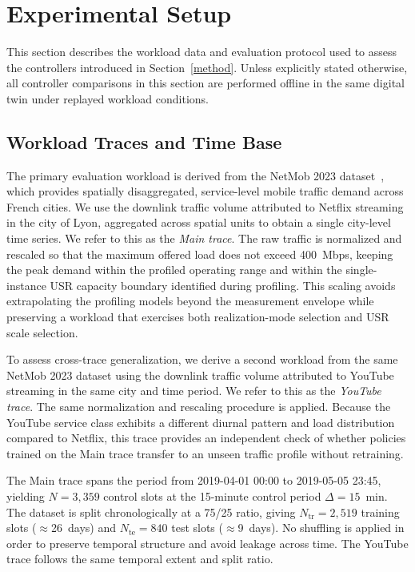 \documentclass[a4paper,fleqn]{cas-sc}
\begin{document}
\section{Experimental Setup}
\label{testbed}

This section describes the workload data and evaluation protocol used to assess the controllers introduced in Section~\ref{method}. Unless explicitly stated otherwise, all controller comparisons in this section are performed offline in the same digital twin under replayed workload conditions.

\subsection{Workload Traces and Time Base}
\label{subsec:workload}

The primary evaluation workload is derived from the NetMob 2023 dataset~\cite{netmob2023}, which provides spatially disaggregated, service-level mobile traffic demand across French cities. We use the downlink traffic volume attributed to Netflix streaming in the city of Lyon, aggregated across spatial units to obtain a single city-level time series. We refer to this as the \emph{Main trace}. The raw traffic is normalized and rescaled so that the maximum offered load does not exceed 400~Mbps, keeping the peak demand within the profiled operating range and within the single-instance USR capacity boundary identified during profiling. This scaling avoids extrapolating the profiling models beyond the measurement envelope while preserving a workload that exercises both realization-mode selection and USR scale selection.

To assess cross-trace generalization, we derive a second workload from the same NetMob 2023 dataset using the downlink traffic volume attributed to YouTube streaming in the same city and time period. We refer to this as the \emph{YouTube trace}. The same normalization and rescaling procedure is applied. Because the YouTube service class exhibits a different diurnal pattern and load distribution compared to Netflix, this trace provides an independent check of whether policies trained on the Main trace transfer to an unseen traffic profile without retraining.

The Main trace spans the period from 2019-04-01 00:00 to 2019-05-05 23:45, yielding $N=3{,}359$ control slots at the 15-minute control period $\Delta=15$~min. The dataset is split chronologically at a 75/25 ratio, giving $N_{\mathrm{tr}}=2{,}519$ training slots ($\approx$26~days) and $N_{\mathrm{te}}=840$ test slots ($\approx$9~days). No shuffling is applied in order to preserve temporal structure and avoid leakage across time. The YouTube trace follows the same temporal extent and split ratio.
\end{document}
